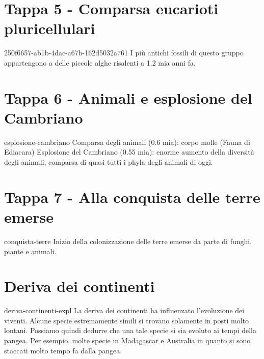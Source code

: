 \documentclass[preview]{standalone}
\begin{document}
\section{Tappa 5 - Comparsa eucarioti pluricellulari}

\begin{snippet}{250f6657-ab1b-4dac-a67b-162d5032a761}
    I più antichi fossili di questo gruppo appartengono a delle
    piccole alghe risalenti a 1.2 mia anni fa.
\end{snippet}

\section{Tappa 6 - Animali e esplosione del Cambriano}

\begin{snippet}{esplosione-cambriano}
    Comparsa degli animali (0.6 mia): corpo molle (Fauna di Ediacara)
    Esplosione del Cambriano (0.55 mia): enorme aumento della diversità
    degli animali, comparsa di quasi tutti i phyla degli animali di oggi.
\end{snippet}

\section{Tappa 7 - Alla conquista delle terre emerse}

\begin{snippet}{conquista-terre}
    Inizio della colonizzazione delle terre emerse da parte
    di funghi, piante e animali.
\end{snippet}

\section{Deriva dei continenti}

\begin{snippet}{deriva-continenti-expl}
    La deriva dei continenti ha influenzato l'evoluzione dei viventi.
    Alcune specie estremamente simili si trovano solamente in posti molto lontani.
    Possiamo quindi dedurre che una tale specie si sia evoluto ai tempi della pangea.
    Per esempio, molte specie in Madagascar e Australia in quanto si sono staccati
    molto tempo fa dalla pangea.
\end{snippet}

\end{document}
